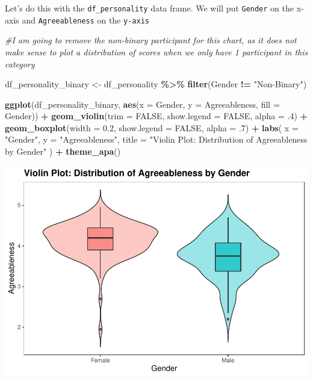 \documentclass[
]{book}
\newenvironment{Shaded}{\begin{snugshade}}{\end{snugshade}}
\newcommand{\AttributeTok}[1]{\textcolor[rgb]{0.13,0.29,0.53}{#1}}
\newcommand{\CommentTok}[1]{\textcolor[rgb]{0.56,0.35,0.01}{\textit{#1}}}
\newcommand{\ConstantTok}[1]{\textcolor[rgb]{0.56,0.35,0.01}{#1}}
\newcommand{\DecValTok}[1]{\textcolor[rgb]{0.00,0.00,0.81}{#1}}
\newcommand{\FloatTok}[1]{\textcolor[rgb]{0.00,0.00,0.81}{#1}}
\newcommand{\FunctionTok}[1]{\textcolor[rgb]{0.13,0.29,0.53}{\textbf{#1}}}
\newcommand{\NormalTok}[1]{#1}
\newcommand{\OtherTok}[1]{\textcolor[rgb]{0.56,0.35,0.01}{#1}}
\newcommand{\SpecialCharTok}[1]{\textcolor[rgb]{0.81,0.36,0.00}{\textbf{#1}}}
\newcommand{\StringTok}[1]{\textcolor[rgb]{0.31,0.60,0.02}{#1}}
\begin{document}
Let's do this with the \texttt{df\_personality} data frame. We will put \texttt{Gender} on the x-axis and \texttt{Agreeableness} on the \texttt{y-axis}

\begin{Shaded}
\begin{Highlighting}[]
\CommentTok{\#I am going to remove the non{-}binary participant for this chart, as it does not make sense to plot a distribution of scores when we only have 1 participant in this category}

\NormalTok{df\_personality\_binary }\OtherTok{\textless{}{-}}\NormalTok{ df\_personality }\SpecialCharTok{\%\textgreater{}\%} 
  \FunctionTok{filter}\NormalTok{(Gender }\SpecialCharTok{!=} \StringTok{"Non{-}Binary"}\NormalTok{)}

\FunctionTok{ggplot}\NormalTok{(df\_personality\_binary, }\FunctionTok{aes}\NormalTok{(}\AttributeTok{x =}\NormalTok{ Gender, }\AttributeTok{y =}\NormalTok{ Agreeableness, }\AttributeTok{fill =}\NormalTok{ Gender)) }\SpecialCharTok{+}
  \FunctionTok{geom\_violin}\NormalTok{(}\AttributeTok{trim =} \ConstantTok{FALSE}\NormalTok{, }
              \AttributeTok{show.legend =} \ConstantTok{FALSE}\NormalTok{, }
              \AttributeTok{alpha =}\NormalTok{ .}\DecValTok{4}\NormalTok{) }\SpecialCharTok{+}
  \FunctionTok{geom\_boxplot}\NormalTok{(}\AttributeTok{width =} \FloatTok{0.2}\NormalTok{, }
               \AttributeTok{show.legend =} \ConstantTok{FALSE}\NormalTok{,}
               \AttributeTok{alpha =}\NormalTok{ .}\DecValTok{7}\NormalTok{) }\SpecialCharTok{+}
  \FunctionTok{labs}\NormalTok{(}
    \AttributeTok{x =} \StringTok{"Gender"}\NormalTok{, }
    \AttributeTok{y =} \StringTok{"Agreeableness"}\NormalTok{,}
    \AttributeTok{title =} \StringTok{"Violin Plot: Distribution of Agreeableness by Gender"} 
\NormalTok{  ) }\SpecialCharTok{+}
  \FunctionTok{theme\_apa}\NormalTok{()}
\end{Highlighting}
\end{Shaded}

\includegraphics{rintro_demo_files/figure-latex/unnamed-chunk-322-1.pdf}
\end{document}
